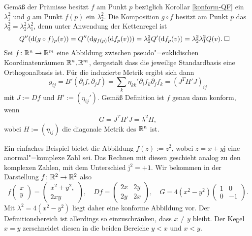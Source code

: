  Gemäß der Prämisse besitzt $f$ am Punkt $p$
bezüglich Korollar \ref{konform-QF} ein $\lambda_1^2$ und $g$ am Punkt
$f(p)$ ein $\lambda_2^2$. Die Komposition $g\circ f$ besitzt am
Punkt $p$ das $\lambda_3^2 = \lambda_2^2\lambda_1^2$, denn unter
Anwendung der Kettenregel ist
\begin{align}
Q''(\mathrm d(g\circ f)_p(v)) &=
Q''(\mathrm dg_{f(p)}(\mathrm df_p(v)))
= \lambda_2^2 Q'(\mathrm df_p(v))
= \lambda_2^2 \lambda_1^2 Q(v).\;\Box
\end{align}
Sei $f\colon\mathbb R^n\to\mathbb R^m$ eine Abbildung zwischen pseudo"=euklidischen
Koordinatenräumen $\mathbb R^n,\mathbb R^m$, dergestalt dass die jeweilige
Standardbasis eine Orthogonalbasis ist. Für die induzierte Metrik
ergibt sich dann
\begin{equation}
g_{ij} = B'(\partial_i f,\partial_j f)
= \sum_{k} \eta_{kk}'\partial_i f_k\partial_j f_k
= (J^T H' J)_{ij}
\end{equation}
mit $J:=Df$ und $H':=(\eta_{ij}')$. Gemäß Definition ist $f$ genau
dann konform, wenn
\begin{equation}
G = J^T H' J = \lambda^2 H,
\end{equation}
wobei $H:=(\eta_{ij})$ die diagonale Metrik des $\mathbb R^n$ ist.

Ein einfaches Beispiel bietet die Abbildung $f(z):=z^2$, wobei
$z=x+y\mathrm j$ eine anormal"=komplexe Zahl sei. Das Rechnen mit
diesen geschieht analog zu den komplexen Zahlen, mit dem Unterschied
$\mathrm j^2=+1$. Wir bekommen in der Darstellung $f\colon\mathbb R^2\to\mathbb R^2$
also
\begin{equation}
f\begin{pmatrix}x\\ y\end{pmatrix}
= \begin{pmatrix}x^2 + y^2,\\ 2xy\end{pmatrix},
\quad Df = \begin{pmatrix}2x & 2y \\ 2y & 2x\end{pmatrix},
\quad G = 4(x^2-y^2)\begin{pmatrix}1 & 0\\ 0 & -1\end{pmatrix}.
\end{equation}
Mit $\lambda^2 = 4(x^2-y^2)$ liegt daher eine konforme Abbildung vor.
Der Definitionsbereich ist allerdings so einzuschränken,
dass $x\ne y$ bleibt. Der Kegel $x=y$ zerschneidet diesen
in die beiden Bereiche $y<x$ und $x<y$.

